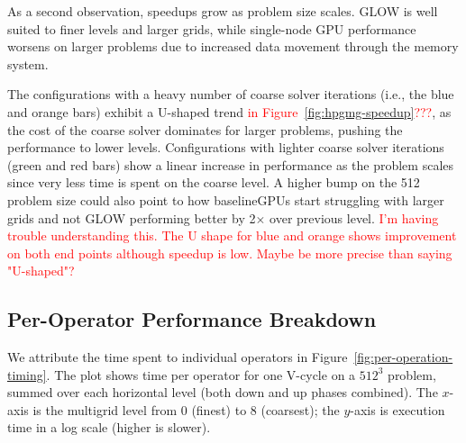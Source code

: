\documentclass[sigconf]{acmart}
\begin{document}
    As a second observation, speedups grow as problem size scales. GLOW is well suited to finer levels and larger grids, while single-node GPU performance %
    worsens on larger problems due to increased data movement through the memory system. %

The configurations with a heavy number of coarse solver iterations (i.e., the blue and orange bars) exhibit a U-shaped trend \textcolor{red}{in Figure~\ref{fig:hpgmg-speedup}???}, as the cost of the coarse solver dominates for larger problems, pushing the performance to lower levels. Configurations with lighter coarse solver iterations (green and red bars) show a linear increase in performance as the problem scales since very less time is spent on the coarse level. A higher bump on the 512 problem size could also point to how baseline\/GPUs start struggling with larger grids and not GLOW performing better by 2$\times$ over previous level.
\textcolor{red}{I'm having trouble understanding this.  The U shape for blue and orange shows improvement on both end points although speedup is low.  Maybe be more precise than saying "U-shaped"?}
    
\subsection{Per-Operator Performance Breakdown}
We attribute the time spent to 
individual operators in Figure~\ref{fig:per-operation-timing}. %
The plot shows time per operator for one V-cycle on a $512^3$ problem, summed over each horizontal level (both down and up phases combined). The $x$-axis is the multigrid level from 0 (finest) to 8 (coarsest); the $y$-axis is execution time in a log scale (higher is slower). %
\end{document}
